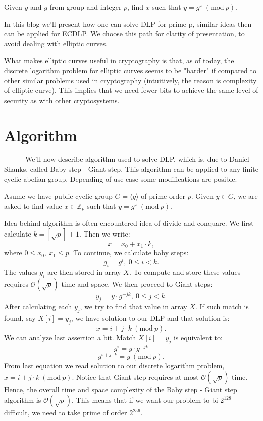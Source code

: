 \documentclass[fleqn,10pt]{olplainarticle}
\begin{document}
Given $y$ and $g$ from group and integer $p$, find $x$ such that 
$y=g^x \ (\textrm {mod}\ p)$.
\vspace{0.2cm}

In this blog we'll present how one can solve DLP for prime p, 
similar ideas then can be applied for ECDLP. We choose this path 
for clarity of presentation, to avoid dealing with elliptic 
curves.

What makes elliptic curves useful in cryptography is that, 
as of today, the discrete logarithm problem for elliptic curves 
seems to be "harder" if compared to other similar problems used 
in cryptography (intuitively, the reason is complexity of 
elliptic curve).  This implies that we need fewer bits to 
achieve the same level of security as with other cryptosystems.

\section*{Algorithm}

\par \ \ \ \ \ \ We'll now describe algorithm used to solve DLP, which is, due to 
Daniel Shanks, called Baby step - Giant step. This algorithm can 
be applied to any finite cyclic abelian group. Depending of use 
case some modifications are posible.
\vspace{0.2cm}

Asume we have public cyclic group $G=\langle g \rangle$ of prime order $p$. 
Given $y\in G$, we are asked to find value $x\in\mathbb{Z}_p$ 
such that $y=g^x\ (\textrm {mod}\ p)$.
\vspace{0.2cm}

Idea behind algorithm is often encountered idea of divide and 
conquare. We first calculate $k=[\sqrt{p}]+1$. Then we write:
$$x=x_0+x_1\cdot k,$$
where $0\leq x_0,\ x_1\leq p$.
To continue, we calculate baby steps:
$$g_i = g^i,\ 0\leq i < k.$$
The values $g_i$ are then stored in array $X$. To compute and store these values requires $\mathcal{O}(\sqrt{p})$ time and space. We then proceed to Giant steps:
$$y_j = y\cdot g^{-jk},\ 0\leq j< k.$$
After calculating each $y_j$, we try to find that value in array $X$. If such match is found, say $X[i]=y_j$, we have solution to our DLP and that solution is:
$$x=i+j\cdot k\ (\textrm {mod}\ p).$$
We can analyze last assertion a bit. Match  $X[i]=y_j$ is equivalent to:
$$g^i=y\cdot g^{-jk}$$
$$g^{i+j\cdot k}=y \ (\textrm{mod}\ p).$$
From last equation we read solution to our discrete logarithm problem, $x=i+j\cdot k\ (\textrm {mod}\ p).$
Notice that Giant step requires at most $\mathcal{O}(\sqrt{p})$ time. Hence, the overall time and space complexity of the Baby step - Giant step algorithm is $\mathcal{O}(\sqrt{p})$. This means that if we want our problem to bi $2^{128}$ difficult, we need to take prime of order $2^{256}$.
\end{document}
